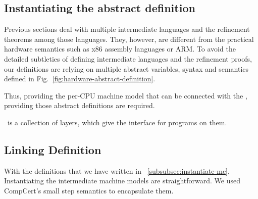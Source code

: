 


\clearpage


\subsection{Instantiating the abstract definition}
\label{subsec:instantiate-mc}

Previous sections deal with multiple intermediate languages and the refinement theorems among those languages. 
They, however, are different from the practical hardware semantics such as x86 assembly languages or ARM. 
To avoid the detailed subtleties of defining intermediate languages and the refinement proofs, 
our definitions are relying on multiple abstract variables, syntax and semantics defined in Fig.~\ref{fig:hardware-abstract-definition}.

Thus, providing the per-CPU machine model that can be connected with the \compcertx, 
providing those abstract definitions are required. 


\compcertx\ is a collection of layers, which give the interface for programs on them.


%
%



\clearpage


\subsection{Linking Definition}
\label{subsec:optimization-mc}

With the definitions that we have written in ~\ref{subsubsec:instantiate-mc}, 
Instantiating the intermediate machine models are straightforward.
We used CompCert's small step semantics to encapsulate them. 
